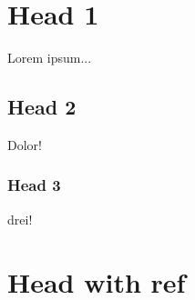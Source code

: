\section{Head 1}
Lorem ipsum...

\subsection{Head 2}
Dolor!

\subsubsection{Head 3}
drei!

\section{Head with ref \label{refname}}
